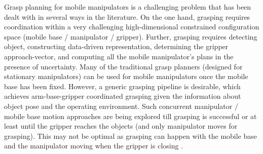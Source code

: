 Grasp planning for mobile manipulators is a challenging problem that has been
dealt with in several ways in the literature. On the one hand, grasping requires coordination
within a very challenging high-dimensional constrained configuration space (mobile base /
manipulator / gripper). Further, grasping requires detecting object, constructing data-driven
representation, determining the gripper approach-vector, and computing all the mobile manipulator's
plans in the presence of uncertainty. Many of the traditional grasp planners (designed for stationary
manipulators) can be used for mobile manipulators once the mobile base has been fixed.
However, a generic grasping pipeline is desirable, which achieves arm-base-gripper
coordinated grasping given the information about object pose and
the operating environment. Such concurrent manipulator / mobile base motion approaches are being
explored till grasping is successful or at least until the gripper reaches the
objects (and only manipulator moves for grasping). This may not be optimal as grasping can happen
with the mobile base and the manipulator moving when the gripper is closing \cite{thakar2023survey}.


